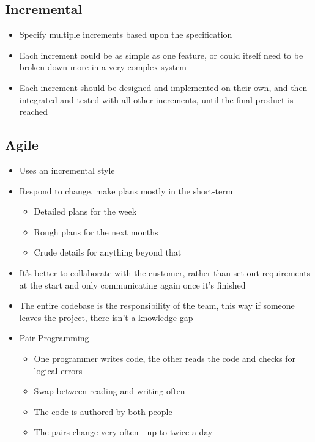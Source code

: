 \subsection*{Incremental}

\begin{itemize}
  \item Specify multiple increments based upon the specification
  \item Each increment could be as simple as one feature, or could itself need to be broken down more in a very complex system
  \item Each increment should be designed and implemented on their own, and then integrated and tested with all other increments, until the final product is reached
\end{itemize}

\subsection*{Agile}

\begin{itemize}
  \item Uses an incremental style
  \item Respond to change, make plans mostly in the short-term
  \begin{itemize}
    \item Detailed plans for the week
    \item Rough plans for the next months
    \item Crude details for anything beyond that
  \end{itemize}
  \item It's better to collaborate with the customer, rather than set out requirements at the start and only communicating again once it's finished
  \item The entire codebase is the responsibility of the team, this way if someone leaves the project, there isn't a knowledge gap
  \item Pair Programming
  \begin{itemize}
    \item One programmer writes code, the other reads the code and checks for logical errors
    \item Swap between reading and writing often
    \item The code is authored by both people
    \item The pairs change very often - up to twice a day
  \end{itemize}
\end{itemize}

